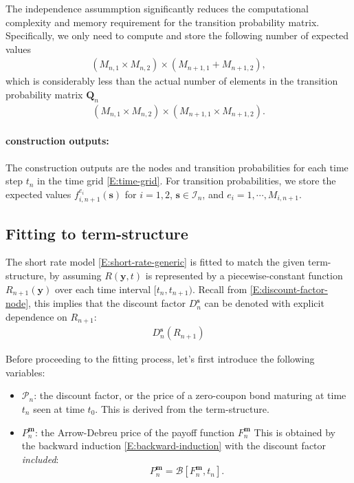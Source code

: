 \documentclass{texyise}
\newcommand{\indexset}{\mathcal{I}}
\newcommand{\valuebackward}{\mathcal{B}}
\begin{document}
The independence assummption significantly reduces the computational complexity and memory requirement for the transition probability matrix. Specifically, we only need to compute and store the following number of expected values
\begin{eqnarray}
    (M_{n,1} \times M_{n,2}) \times (M_{n+1,1} + M_{n+1,2}),
\end{eqnarray}
which is considerably less than the actual number of elements in the transition probability matrix $\bm{Q}_n$
\begin{eqnarray}
    (M_{n,1} \times M_{n,2}) \times (M_{n+1,1} \times M_{n+1,2}).
\end{eqnarray}

\paragraph*{construction outputs:}

The construction outputs are the nodes and transition probabilities for each time step $t_n$ in the time grid \eqref{E:time-grid}. For transition probabilities, we store the expected values $f_{i,n+1}^{e_i}(\bm{s})$ for $i = 1, 2$, $\bm{s} \in \indexset_n$, and $e_i = 1, \cdots, M_{i,n+1}$.

\subsection{Fitting to term-structure}
\label{S:fitting-term-structure}

The short rate model \eqref{E:short-rate-generic} is fitted to match the given term-structure, by assuming $R(\bm{y}, t)$ is represented by a piecewise-constant function $R_{n+1}(\bm{y})$ over each 
time interval $[t_n, t_{n+1})$. Recall from \eqref{E:discount-factor-node}, this implies that the discount factor $D_n^{\bm{s}}$ can be denoted with explicit dependence on $R_{n+1}$: 
\begin{eqnarray}
    D_n^{\bm{s}}(R_{n+1})
\end{eqnarray}

Before proceeding to the fitting process, let's first introduce the following variables:
\begin{itemize}
    \item $\mathcal{P}_n$: the discount factor, or the price of a zero-coupon bond maturing at time $t_n$ seen at time $t_0$. This is derived from the term-structure.
    \item $P_n^{\bm{m}}$: the Arrow-Debreu price of the payoff function $F_n^{\bm{m}}$ This is obtained by the backward induction \eqref{E:backward-induction} with the discount factor {\em included}:
    \begin{equation}
        P_n^{\bm{m}} = \valuebackward[F_n^{\bm{m}}, t_n].
    \end{equation}
\end{itemize}
\end{document}
